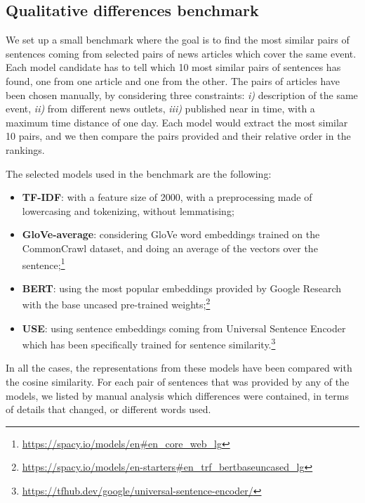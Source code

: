 \subsection{Qualitative differences benchmark}
\label{ssec:cgs_similarity_qualitative}
We set up a small benchmark where the goal is to find the most similar pairs of sentences coming from selected pairs of news articles which cover the same event. Each model candidate has to tell which 10 most similar pairs of sentences has found, one from one article and one from the other.
The pairs of articles have been chosen manually, by considering three constraints: \textit{i)} description of the same event, \textit{ii)} from different news outlets, \textit{iii)} published near in time, with a maximum time distance of one day.
Each model would extract the most similar 10 pairs, and we then compare the pairs provided and their relative order in the rankings.

The selected models used in the benchmark are the following:
\begin{itemize}
    \item \textbf{TF-IDF}: with a feature size of 2000, with a preprocessing made of lowercasing and tokenizing, without lemmatising;
    \item \textbf{GloVe-average}: considering GloVe word embeddings trained on the CommonCrawl dataset, and doing an average of the vectors over the sentence;\footnote{\url{https://spacy.io/models/en\#en_core_web_lg}}
    \item \textbf{BERT}: using the most popular embeddings provided by Google Research~\citep{devlin2018bert} with the base uncased pre-trained weights;\footnote{\url{https://spacy.io/models/en-starters\#en_trf_bertbaseuncased_lg}}
    \item \textbf{USE}: using sentence embeddings coming from Universal Sentence Encoder~\citep{cer2018universal} which has been specifically trained for sentence similarity.\footnote{\url{https://tfhub.dev/google/universal-sentence-encoder/}}
\end{itemize}

In all the cases, the representations from these models have been compared with the cosine similarity.
For each pair of sentences that was provided by any of the models, we listed by manual analysis which differences were contained, in terms of details that changed, or different words used.

